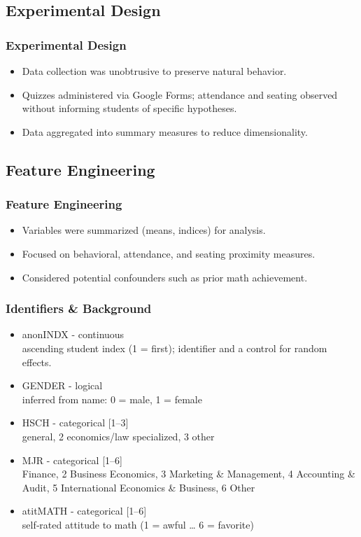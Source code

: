 \documentclass{beamer} %
\theoremstyle{definition}
\begin{document}
	\subsection{Experimental Design}
	\begin{frame}
		\frametitle{Experimental Design}
		\begin{itemize}
			\item Data collection was unobtrusive to preserve natural behavior.
			\item Quizzes administered via Google Forms; attendance and seating observed without informing students of specific hypotheses.
			\item Data aggregated into summary measures to reduce dimensionality.
		\end{itemize}
	\end{frame}
	
	\subsection{Feature Engineering}
	\begin{frame}
		\frametitle{Feature Engineering}
		\begin{itemize}
			\item Variables were summarized (means, indices) for analysis.
			\item Focused on behavioral, attendance, and seating proximity measures.
			\item Considered potential confounders such as prior math achievement.
		\end{itemize}
	\end{frame}
	
	\begin{frame}
		\frametitle{Identifiers \& Background}
		\begin{itemize}
			\item anonINDX - continuous \\
			\subitem ascending student index (1 = first); identifier and a control for random effects.
			\item GENDER - logical \\
			\subitem inferred from name: 0 = male, 1 = female
			\item HSCH - categorical [1--3] \\
			 general, 2 economics/law specialized, 3 other
			\item MJR - categorical [1--6]  \\
			 Finance, 2 Business Economics, 3 Marketing \& Management, 4 Accounting \& Audit, 5 International Economics \& Business, 6 Other
			\item atitMATH - categorical [1--6]  \\
			\subitem self‑rated attitude to math (1 = awful … 6 = favorite)
		\end{itemize}
	\end{frame}
	
\end{document}
